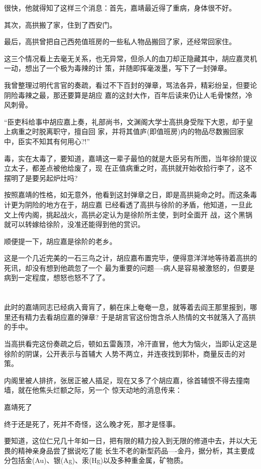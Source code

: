 \documentclass[11pt,a4paper,onecolumn]{article}
\begin{document}
很快，他就得知了这样三个消息：首先，嘉靖最近得了重病，身体很不好。

其次，高拱搬了家，住到了西安门。

最后，高拱曾把自己西苑值班房的一些私人物品搬回了家，还经常回家住。

这三个情况看上去毫无关系，也无异常，但杀人的血刀却正隐藏其中，胡应嘉灵机一动，想出了一个极为毒辣的计
策，并随即挥毫泼墨，写下了一封弹章。

我曾整理过明代言官的奏疏，看过不下百封的弹章，骂法各异，精彩纷呈，但要论阴险毒辣之最，那还要算是胡应
嘉的这封大作，百年后读来仍让人毛骨悚然，冷风刺骨。

``臣吏科给事中胡应嘉上奏，礼部尚书，文渊阁大学士高拱身受陛下大恩，却于皇上病重之时脱离职守，擅自回
家，并将其值庐(即值班房)内的物品尽数搬回家中，臣实不知其有何用心?!''

毒，实在太毒了，要知道，嘉靖这一辈子最怕的就是大臣另有所图，当年徐阶提议立太子，都差点被他给废了，现
在正值病重之时，高拱就开始收拾行李了，这不摆明了是要另起炉灶吗?　

按照嘉靖的性格，如无意外，他看到这封弹章之日，即是高拱毙命之时。而这条毒计更为阴险的地方在于，胡应嘉
已经看透了高拱与徐阶的矛盾，他知道，一旦此文上传内阁，挑起战火，高拱必定认为是徐阶所主使，到时全面开
战，这个黑锅就可以转嫁给徐阶，没准还能得到他的赏识。

顺便提一下，胡应嘉是徐阶的老乡。

这是一个几近完美的一石三鸟之计，胡应嘉布置完毕，便得意洋洋地等待着高拱的死讯，却没有想到他疏忽了一个
最为重要的问题----病人是容易被激怒的，但要是病到一定程度，想怒也怒不了了。

\section[\thesection]{}

此时的嘉靖同志已经病入膏肓了，躺在床上奄奄一息，就等着去阎王那里报到，哪里还有精力去看胡应嘉的弹章?
于是胡言官这份饱含杀人热情的文书就落入了高拱的手中。

当高拱看完这份奏疏之后，顿如五雷轰顶，冷汗直冒，他大为恼火，当即认定这是徐阶的阴谋，公开表示与首辅大
人势不两立，并连夜找到郭朴，商量反击的对策。

内阁里被人排挤，张居正被人插足，现在又多了个胡应嘉，徐首辅恨不得去撞南墙，就在他焦头烂额之际，另一个
惊天动地的消息传来：

嘉靖死了

终于还是死了，死并不奇怪，这么晚才死，那才是怪事。

要知道，这位仁兄几十年如一日，把有限的精力投入到无限的修道中去，并以大无畏的精神亲身品尝了据说吃了能
长生不老的新型药品----金丹，据分析，其主要成分包括金(Au)、银(Ag)、汞(Hg)以及多种重金属，矿物质。
\end{document}
